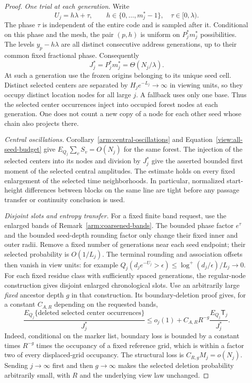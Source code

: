 \begin{proof}
\smallskip\noindent\emph{One trial at each generation.}
Write
\[
 U_j=h\lambda+\tau,\qquad
 h\in\{0,\ldots,m_j^*-1\},\quad \tau\in[0,\lambda).
\]
The phase $\tau$ is independent of the entire code and is sampled
after it.  Conditional on this phase and the mesh, the pair $(p,h)$
is uniform on $P_j^*m_j^*$ possibilities.  The levels
$y_p-h\lambda$ are all distinct consecutive address generations,
up to their common fixed fractional phase.  Consequently
\begin{equation}\label{view:all-seed-level-count}
 J_j^*=P_j^*m_j^*=\Theta(N_j/\lambda).
\end{equation}
At such a generation use the frozen origins belonging to its unique
seed cell.  Distinct selected centers are separated by
$H_je^{-L_j}\to\infty$ in viewing units, so they occupy distinct
location nodes for all large $j$.  A fallback uses only one base.
Thus the selected center occurrences inject into occupied forest
nodes at each generation.  One does not count a new copy of a node
for each other seed whose chain also projects there.

\smallskip\noindent\emph{Central oscillations.}
Corollary~\ref{arm:central-oscillations} and
Equation~\eqref{view:all-seed-budget} give
$E_{Q_j}\sum_vS_v=O(N_j)$ for the same forest.  The injection of the
selected centers into its nodes and division by $J_j^*$ give the
asserted bounded first moment of the selected central amplitudes.
The estimate holds on every fixed enlargement of the selected time
neighborhoods.  In particular, normalized start-height differences
between blocks on the same line are tight before any passage transfer
or continuity conclusion is used.

\smallskip\noindent\emph{Disjoint slots and entropy transfer.}
For a fixed finite band request, use the enlarged bands of
Remark~\ref{arm:coarsened-bands}.  The bounded phase factor $e^\tau$
and the bounded seed-depth rounding factor only change their fixed
inner and outer radii.  Remove a fixed number of generations near
each seed endpoint; their selected probability is $O(1/L_j)$.
The terminal rounding and association offsets then vanish in view
units: for example
$Q_j(d_je^{-U_j}>\epsilon)\le
\log^+(d_j/\epsilon)/L_j\to0$.
For each fixed residue class with sufficiently spaced generations,
the regular-node construction gives disjoint enlarged chronological
slots.  Use an arbitrarily large \emph{fixed} ancestor depth $g$ in
that construction.  Its boundary-deletion proof gives, for a constant
$C_{A,R}$ depending on the requested bands,
\[
 \frac{E_{Q_j}\{\text{deleted selected center occurrences}\}}{J_j^*}
 \le o_j(1)+C_{A,R}R^{-g}
              \frac{E_{Q_j}\mathsf T_j}{J_j^*}.
\]
Indeed, conditional on the marker list, boundary loss is bounded by
a constant times $R^{-g}$ times the occupancy of a fixed reference
grid, which is within a factor two of every displaced-grid occupancy.
The structural loss is $C_{R,g}M_j=o(N_j)$.  Sending $j\to\infty$
first and then $g\to\infty$ makes the selected deletion probability
arbitrarily small, with $R$ and the underlying view law unchanged.


\end{proof}
